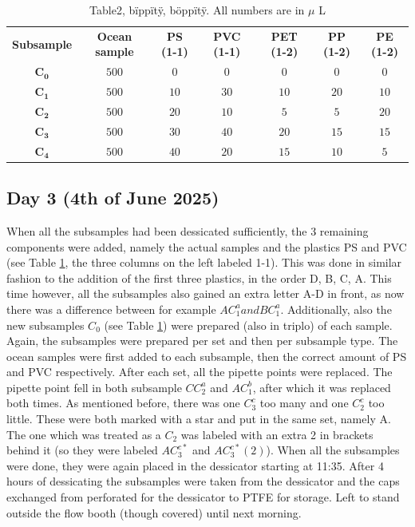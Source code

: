 \documentclass[twocolumn,a4paper,aps,amsmath,amssymb,floatfix,superscriptaddress]{revtex4-2}
\begin{document}
	\begin{table}
		\centering
		\begin{threeparttable}
			\caption[table]{Table2, bïppïtÿ, böppïtÿ. All numbers are in $\mu$ L}
			\label{tab:Subsample_make-up}
			\begin{tabular}{c||c|c|c|c|c|c}
				\textbf{Subsample} & \textbf{Ocean sample } & \textbf{PS (1-1)} & \textbf{PVC (1-1)} & \textbf{PET (1-2)} & \textbf{PP (1-2)} & \textbf{PE (1-2)} \\
				\hhline{=======}
				 $\mathbf{C_0}$ & $500$ & $0$ & $0$ & $0$& $0$ & $0$ \\
				\hline
				  $\mathbf{C_1}$ & $500$ & $10$ & $30$ & $10$ & $20$ & $10$ \\
				\hline
				 $\mathbf{C_2}$ & $500$ & $20$ & $10$ & $5$ & $5$ & $20$ \\
				\hline
				 $\mathbf{C_3}$ & $500$ & $30$ & $40$ & $20$ & $15$ & $15$ \\
				\hline
				 $\mathbf{C_4}$ & $500$ & $40$ & $20$ & $15$ & $10$ & $5$ \\			
			\end{tabular}
		\end{threeparttable}
	\end{table}
	
	\subsection{Day 3 (4th of June 2025)}
	When all the subsamples had been dessicated sufficiently, the 3 remaining components were added, namely the actual samples and the plastics PS and PVC (see Table \ref{tab:Subsample_make-up}, the three columns on the left labeled 1-1). This was done in similar fashion to the addition of the first three plastics, in the order D, B, C, A. This time however, all the subsamples also gained an extra letter A-D in front, as now there was a difference between for example $AC_1^a and BC_1^a$. Additionally, also the new subsamples $C_0$ (see Table \ref{tab:Subsample_make-up}) were prepared (also in triplo) of each sample. Again, the subsamples were prepared per set and then per subsample type. The ocean samples were first added to each subsample, then the correct amount of PS and PVC respectively. 
	After each set, all the pipette points were replaced. The pipette point fell in both subsample $CC_2^a$ and $AC_1^b$, after which it was replaced both times. As mentioned before, there was one $C_3^c$ too many and one $C_2^c$ too little. These were both marked with a star and put in the same set, namely A. The one which was treated as a $C_2$ was labeled with an extra 2 in brackets behind it (so they were labeled $AC_3^{c*}$ and $AC_3^{c*} (2)$). When all the subsamples were done, they were again placed in the dessicator starting at 11:35.
	After 4 hours of dessicating the subsamples were taken from the dessicator and the caps exchanged from perforated for the dessicator to PTFE for storage. Left to stand outside the flow booth (though covered) until next morning.
	
\end{document}
